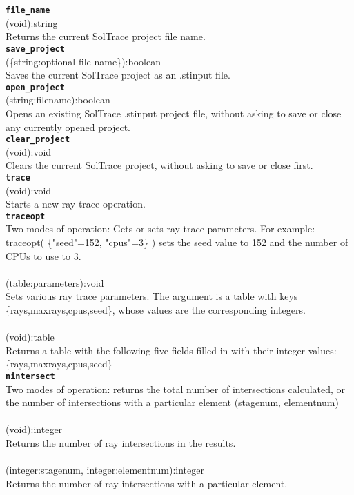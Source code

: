\documentclass{article}
\begin{document}
{\large \texttt{\textbf{file\_name}}}\\
\textsf{ (void):string }\\
Returns the current SolTrace project file name.\\

{\large \texttt{\textbf{save\_project}}}\\
\textsf{ (\{string:optional file name\}):boolean }\\
Saves the current SolTrace project as an .stinput file.\\

{\large \texttt{\textbf{open\_project}}}\\
\textsf{ (string:filename):boolean }\\
Opens an existing SolTrace .stinput project file, without asking to save or close any currently opened project.\\

{\large \texttt{\textbf{clear\_project}}}\\
\textsf{ (void):void }\\
Clears the current SolTrace project, without asking to save or close first.\\

{\large \texttt{\textbf{trace}}}\\
\textsf{ (void):void }\\
Starts a new ray trace operation.\\

{\large \texttt{\textbf{traceopt}}}\\
Two modes of operation: Gets or sets ray trace parameters. For example: traceopt( \{"seed"=152, "cpus"=3\} ) sets the seed value to 152 and the number of CPUs to use to 3.\\\\
\textsf{ (table:parameters):void }\\
Sets various ray trace parameters. The argument is a table with keys \{rays,maxrays,cpus,seed\}, whose values are the corresponding integers.\\
\\\textsf{ (void):table }\\
Returns a table with the following five fields filled in with their integer values: \{rays,maxrays,cpus,seed\}\\

{\large \texttt{\textbf{nintersect}}}\\
Two modes of operation: returns the total number of intersections calculated, or the number of intersections with a particular element (stagenum, elementnum)\\\\
\textsf{ (void):integer }\\
Returns the number of ray intersections in the results.\\
\\\textsf{ (integer:stagenum, integer:elementnum):integer }\\
Returns the number of ray intersections with a particular element.\\
\end{document}
